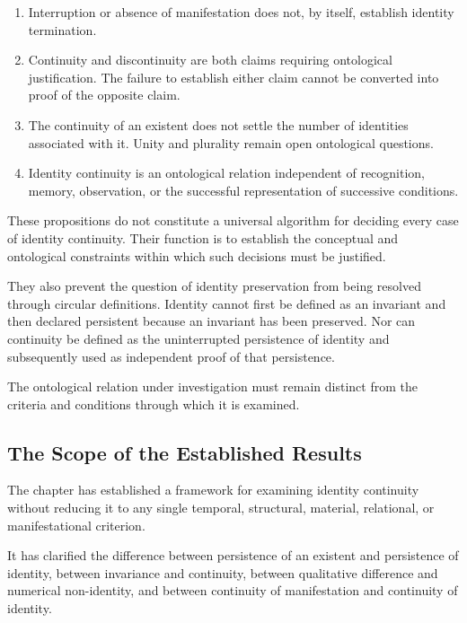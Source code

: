 \begin{enumerate}
    \item Interruption or absence of manifestation does not, by itself,
    establish identity termination.

    \item Continuity and discontinuity are both claims requiring
    ontological justification. The failure to establish either claim
    cannot be converted into proof of the opposite claim.

    \item The continuity of an existent does not settle the number of
    identities associated with it. Unity and plurality remain open
    ontological questions.

    \item Identity continuity is an ontological relation independent
    of recognition, memory, observation, or the successful representation
    of successive conditions.

\end{enumerate}

These propositions do not constitute a universal algorithm for deciding
every case of identity continuity. Their function is to establish the
conceptual and ontological constraints within which such decisions must
be justified.

They also prevent the question of identity preservation from being
resolved through circular definitions. Identity cannot first be defined
as an invariant and then declared persistent because an invariant has
been preserved. Nor can continuity be defined as the uninterrupted
persistence of identity and subsequently used as independent proof of
that persistence.

The ontological relation under investigation must remain distinct from
the criteria and conditions through which it is examined.

\subsection{The Scope of the Established Results}

The chapter has established a framework for examining identity continuity
without reducing it to any single temporal, structural, material, relational,
or manifestational criterion.

It has clarified the difference between persistence of an existent and
persistence of identity, between invariance and continuity, between
qualitative difference and numerical non-identity, and between continuity
of manifestation and continuity of identity.

